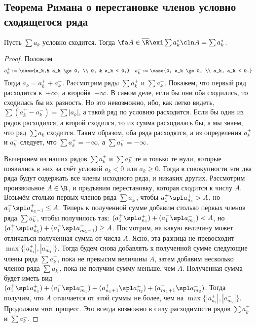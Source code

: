\documentclass[a4paper]{article}
\newcommand{\sap}[2]{a_{{#1}}^+ \spl a_{{#2}}^+}
\newcommand{\sam}[2]{a_{{#1}}^- \spl a_{{#2}}^-}
\begin{document}
\subsection{Теорема Римана о перестановке членов условно сходящегося ряда}

\begin{theorem}[Римана]
Пусть $\sum a_k$ условно сходится. Тогда $\fa A \in \overline{\R} \exi \sum a_k^*\cln A=\sum a_k^*$.
\end{theorem}
\begin{proof}
Положим $$a_k^+ := \case{a_k,& a_k \ge 0, \\ 0, & a_k < 0,} \quad
a_k^- := \case{0, a_k \ge 0, \\ a_k, a_k < 0.}$$
Тогда $a_k = a_k^+ + a_k^-$. Рассмотрим ряды
$\sum a_k^+$ и $\sum a_k^-$. Покажем, что первый ряд расходится к~$+\infty$, а второй\т к~$-\infty$. В самом деле, если бы они оба сходились,
то сходилась бы их разность. Но это невозможно, ибо, как легко видеть, $\sum (a_k^+ - a_k^-) = \sum |a_k|$, а такой ряд по условию расходится.
Если бы один из рядов расходился, а второй сходился, то их сумма расходилась бы, а мы знаем, что ряд $\sum a_k$ сходится. Таким образом,
оба ряда расходятся, а из определения $a_k^+$ и $a_k^-$ следует, что $\sum a_k^+ = +\infty$, а $\sum a_k^-=-\infty$.

Вычеркнем из наших рядов $\sum a_k^+$ и $\sum a_k^-$ те и только те нули, которые появились в них за счёт условий $a_k <0$ или $a_k \ge 0$.
Тогда в совокупности эти два ряда будут содержать все члены исходного ряда, и никаких других.
Рассмотрим произвольное $A \in \R$,
и предъявим перестановку, которая сходится к числу $A$. Возьмём столько первых членов ряда $\sum a_k^+$, чтобы
$\sap{1}{n_1} > A$, но $\sap{1}{n_1-1} \le A$. Теперь к полученной сумме добавим столько первых членов ряда $\sum a_k^-$, чтобы
получилось так: $(\sap{1}{n_1}) + (\sam{1}{m_1}) < A$, но $(\sap{1}{n_1}) + (\sam{1}{m_1-1}) \ge A$. Посмотрим, на какую величину
может отличаться полученная сумма от числа $A$. Ясно, эта разница не превосходит $\max \{|a_{n_1}^+|, |a_{m_1}^-| \}$. Тогда будем снова
добавлять к полученной сумме следующие члены ряда $\sum a_k^+$, пока не превысим величины $A$, затем добавим несколько членов ряда $\sum a_k^-$,
пока не получим сумму меньше, чем $A$. Полученная сумма будет иметь вид $(\sap{1}{n_1})+(\sam{1}{m_1})+(\sap{n_1+1}{n_2})+(\sam{m_1+1}{m_2})$.
Тогда получим, что $A$ отличается от этой суммы не более, чем на $\max \{|a_{n_2}^+|, |a_{m_2}^-| \}$. Продолжим этот процесс. Это всегда возможно
в силу расходимости рядов $\sum a_k^+$ и $\sum a_k^-$.


\end{proof}
\end{document}
